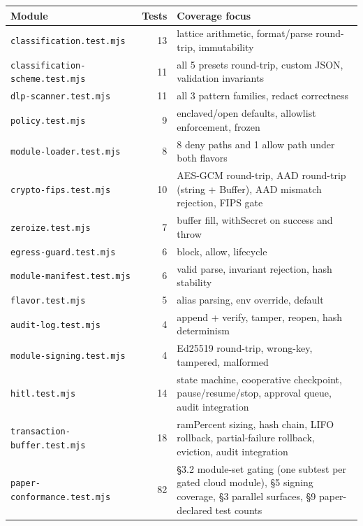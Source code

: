 \documentclass[11pt]{article}
\begin{document}
\begin{table}[t]
  \centering
  \small
  \begin{tabular}{|l|r|p{6cm}|}
    \hline
    \textbf{Module} & \textbf{Tests} & \textbf{Coverage focus} \\
    \hline
    \texttt{classification.test.mjs}        & 13 & lattice arithmetic, format/parse round-trip, immutability \\
    \hline
    \texttt{classification-scheme.test.mjs} & 11 & all 5 presets round-trip, custom JSON, validation invariants \\
    \hline
    \texttt{dlp-scanner.test.mjs}           & 11 & all 3 pattern families, redact correctness \\
    \hline
    \texttt{policy.test.mjs}                & 9  & enclaved/open defaults, allowlist enforcement, frozen \\
    \hline
    \texttt{module-loader.test.mjs}         & 8  & 8 deny paths and 1 allow path under both flavors \\
    \hline
    \texttt{crypto-fips.test.mjs}           & 10 & AES-GCM round-trip, AAD round-trip (string + Buffer), AAD mismatch rejection, FIPS gate \\
    \hline
    \texttt{zeroize.test.mjs}               & 7  & buffer fill, withSecret on success and throw \\
    \hline
    \texttt{egress-guard.test.mjs}          & 6  & block, allow, lifecycle \\
    \hline
    \texttt{module-manifest.test.mjs}       & 6  & valid parse, invariant rejection, hash stability \\
    \hline
    \texttt{flavor.test.mjs}                & 5  & alias parsing, env override, default \\
    \hline
    \texttt{audit-log.test.mjs}             & 4  & append + verify, tamper, reopen, hash determinism \\
    \hline
    \texttt{module-signing.test.mjs}        & 4  & Ed25519 round-trip, wrong-key, tampered, malformed \\
    \hline
    \texttt{hitl.test.mjs}                  & 14 & state machine, cooperative checkpoint, pause/resume/stop, approval queue, audit integration \\
    \hline
    \texttt{transaction-buffer.test.mjs}    & 18 & ramPercent sizing, hash chain, LIFO rollback, partial-failure rollback, eviction, audit integration \\
    \hline
    \texttt{paper-conformance.test.mjs} & 82 & §3.2 module-set gating (one subtest per gated cloud module), §5 signing coverage, §3 parallel surfaces, §9 paper-declared test counts \\

\end{tabular}
\end{table}
\end{document}
